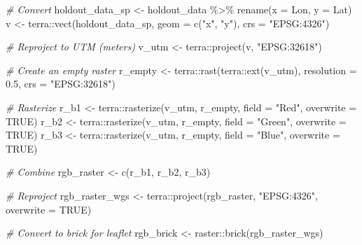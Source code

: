 \documentclass[
]{article}
\newenvironment{Shaded}{\begin{snugshade}}{\end{snugshade}}
\newcommand{\AttributeTok}[1]{\textcolor[rgb]{0.77,0.63,0.00}{#1}}
\newcommand{\CommentTok}[1]{\textcolor[rgb]{0.56,0.35,0.01}{\textit{#1}}}
\newcommand{\ConstantTok}[1]{\textcolor[rgb]{0.00,0.00,0.00}{#1}}
\newcommand{\FloatTok}[1]{\textcolor[rgb]{0.00,0.00,0.81}{#1}}
\newcommand{\FunctionTok}[1]{\textcolor[rgb]{0.00,0.00,0.00}{#1}}
\newcommand{\NormalTok}[1]{#1}
\newcommand{\OtherTok}[1]{\textcolor[rgb]{0.56,0.35,0.01}{#1}}
\newcommand{\SpecialCharTok}[1]{\textcolor[rgb]{0.00,0.00,0.00}{#1}}
\newcommand{\StringTok}[1]{\textcolor[rgb]{0.31,0.60,0.02}{#1}}
\begin{document}
\begin{Shaded}
\begin{Highlighting}[]
\CommentTok{\# Convert}
\NormalTok{holdout\_data\_sp }\OtherTok{\textless{}{-}}\NormalTok{ holdout\_data }\SpecialCharTok{\%\textgreater{}\%} 
  \FunctionTok{rename}\NormalTok{(}\AttributeTok{x =}\NormalTok{ Lon, }\AttributeTok{y =}\NormalTok{ Lat)}
\NormalTok{v }\OtherTok{\textless{}{-}}\NormalTok{ terra}\SpecialCharTok{::}\FunctionTok{vect}\NormalTok{(holdout\_data\_sp, }\AttributeTok{geom =} \FunctionTok{c}\NormalTok{(}\StringTok{"x"}\NormalTok{, }\StringTok{"y"}\NormalTok{), }\AttributeTok{crs =} \StringTok{"EPSG:4326"}\NormalTok{)}

\CommentTok{\# Reproject to UTM (meters)}
\NormalTok{v\_utm }\OtherTok{\textless{}{-}}\NormalTok{ terra}\SpecialCharTok{::}\FunctionTok{project}\NormalTok{(v, }\StringTok{"EPSG:32618"}\NormalTok{)}

\CommentTok{\# Create an empty raster}
\NormalTok{r\_empty }\OtherTok{\textless{}{-}}\NormalTok{ terra}\SpecialCharTok{::}\FunctionTok{rast}\NormalTok{(terra}\SpecialCharTok{::}\FunctionTok{ext}\NormalTok{(v\_utm), }\AttributeTok{resolution =} \FloatTok{0.5}\NormalTok{, }\AttributeTok{crs =} \StringTok{"EPSG:32618"}\NormalTok{)}

\CommentTok{\# Rasterize}
\NormalTok{r\_b1 }\OtherTok{\textless{}{-}}\NormalTok{ terra}\SpecialCharTok{::}\FunctionTok{rasterize}\NormalTok{(v\_utm, r\_empty, }\AttributeTok{field =} \StringTok{"Red"}\NormalTok{, }\AttributeTok{overwrite =} \ConstantTok{TRUE}\NormalTok{)}
\NormalTok{r\_b2 }\OtherTok{\textless{}{-}}\NormalTok{ terra}\SpecialCharTok{::}\FunctionTok{rasterize}\NormalTok{(v\_utm, r\_empty, }\AttributeTok{field =} \StringTok{"Green"}\NormalTok{, }\AttributeTok{overwrite =} \ConstantTok{TRUE}\NormalTok{)}
\NormalTok{r\_b3 }\OtherTok{\textless{}{-}}\NormalTok{ terra}\SpecialCharTok{::}\FunctionTok{rasterize}\NormalTok{(v\_utm, r\_empty, }\AttributeTok{field =} \StringTok{"Blue"}\NormalTok{, }\AttributeTok{overwrite =} \ConstantTok{TRUE}\NormalTok{)}

\CommentTok{\# Combine}
\NormalTok{rgb\_raster }\OtherTok{\textless{}{-}} \FunctionTok{c}\NormalTok{(r\_b1, r\_b2, r\_b3)}

\CommentTok{\# Reproject}
\NormalTok{rgb\_raster\_wgs }\OtherTok{\textless{}{-}}\NormalTok{ terra}\SpecialCharTok{::}\FunctionTok{project}\NormalTok{(rgb\_raster, }\StringTok{"EPSG:4326"}\NormalTok{, }\AttributeTok{overwrite =} \ConstantTok{TRUE}\NormalTok{)}

\CommentTok{\# Convert to brick for leaflet}
\NormalTok{rgb\_brick }\OtherTok{\textless{}{-}}\NormalTok{ raster}\SpecialCharTok{::}\FunctionTok{brick}\NormalTok{(rgb\_raster\_wgs)}
\end{Highlighting}
\end{Shaded}
\end{document}
